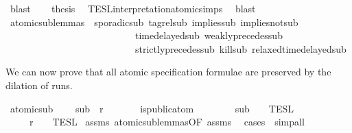 \begin{isabellebody}
\ blast\isanewline
\ \ \isamarkupfalse%
\ {\isacharquery}thesis\ \isamarkupfalse%
\ TESL{\isacharunderscore}interpretation{\isacharunderscore}atomic{\isachardot}simps{\isacharparenleft}{}{\isacharparenright}\ \isamarkupfalse%
\ blast\isanewline
{}\isamarkupfalse%
%
\endisatagproof
{\isafoldproof}%
%
\isadelimproof
\isanewline
%
\endisadelimproof
\isanewline
{}\isamarkupfalse%
\ atomic{\isacharunderscore}sub{\isacharunderscore}lemmas\ {\isacharequal}\ sporadic{\isacharunderscore}sub\ tagrel{\isacharunderscore}sub\ implies{\isacharunderscore}sub\ implies{\isacharunderscore}not{\isacharunderscore}sub\isanewline
\ \ \ \ \ \ \ \ \ \ \ \ \ \ \ \ \ \ \ \ \ \ \ \ \ \ \ time{\isacharunderscore}delayed{\isacharunderscore}sub\ weakly{\isacharunderscore}precedes{\isacharunderscore}sub\isanewline
\ \ \ \ \ \ \ \ \ \ \ \ \ \ \ \ \ \ \ \ \ \ \ \ \ \ \ strictly{\isacharunderscore}precedes{\isacharunderscore}sub\ kill{\isacharunderscore}sub\ relaxed{\isacharunderscore}time{\isacharunderscore}delayed{\isacharunderscore}sub%
\begin{isamarkuptext}%
We can now prove that all atomic specification formulae are preserved
  by the dilation of runs.%
\end{isamarkuptext}\isamarkuptrue%
\isamarkupfalse%
\ atomic{\isacharunderscore}sub{\isacharcolon}\ \isanewline
\ \ \ {\isacartoucheopen}sub\ {\isasymlless}\ r{\isacartoucheclose}\isanewline
\ \ \ \ \ \ \ {\isacartoucheopen}is{\isacharunderscore}public{\isacharunderscore}atom\ {\isasymphi}{\isacartoucheclose}\isanewline
\ \ \ \ \ \ \ {\isacartoucheopen}sub\ {\isasymin}\ {\isasymlbrakk}\ {\isasymphi}\ {\isasymrbrakk}\isactrlsub T\isactrlsub E\isactrlsub S\isactrlsub L{\isacartoucheclose}\isanewline
\ \ \ \ \ {\isacartoucheopen}r\ {\isasymin}\ {\isasymlbrakk}\ {\isasymphi}\ {\isasymrbrakk}\isactrlsub T\isactrlsub E\isactrlsub S\isactrlsub L{\isacartoucheclose}\isanewline
%
\isadelimproof
%
\endisadelimproof
%
\isatagproof
{}\isamarkupfalse%
\ assms{\isacharparenleft}{}{\isacharcomma}{}{\isacharparenright}\ atomic{\isacharunderscore}sub{\isacharunderscore}lemmas{\isacharbrackleft}OF\ assms{\isacharparenleft}{}{\isacharparenright}{\isacharbrackright}\ \isamarkupfalse%
\ {\isacharparenleft}cases\ {\isasymphi}{\isacharcomma}\ simp{\isacharunderscore}all{\isacharparenright}%
\endisatagproof
{\isafoldproof}%
%
\isadelimproof

\end{isabellebody}
